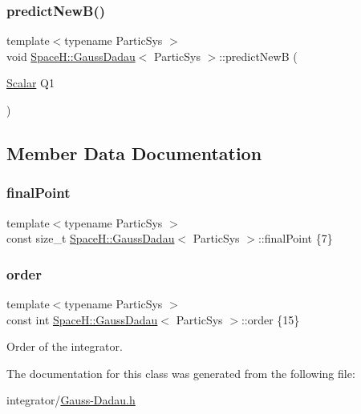 \subsubsection{\texorpdfstring{predict\+New\+B()}{predictNewB()}}
{\footnotesize\ttfamily template$<$typename Partic\+Sys $>$ \\
void \mbox{\hyperlink{class_space_h_1_1_gauss_dadau}{Space\+H\+::\+Gauss\+Dadau}}$<$ Partic\+Sys $>$\+::predict\+NewB (\begin{DoxyParamCaption}\item[{\mbox{\hyperlink{class_space_h_1_1_gauss_dadau_ace42540e9fb47d7f1d1f00622bbd1ccb}{Scalar}}}]{Q1 }\end{DoxyParamCaption})\hspace{0.3cm}{\ttfamily [inline]}}



\subsection{Member Data Documentation}
\mbox{\label{class_space_h_1_1_gauss_dadau_ac671afa9ebffbf85891ba283076d04f1}} 
\subsubsection{\texorpdfstring{final\+Point}{finalPoint}}
{\footnotesize\ttfamily template$<$typename Partic\+Sys $>$ \\
const size\+\_\+t \mbox{\hyperlink{class_space_h_1_1_gauss_dadau}{Space\+H\+::\+Gauss\+Dadau}}$<$ Partic\+Sys $>$\+::final\+Point \{7\}\hspace{0.3cm}{\ttfamily [static]}}

\mbox{\label{class_space_h_1_1_gauss_dadau_aa306d2c64787f9a38901bdddc791c938}} 
\subsubsection{\texorpdfstring{order}{order}}
{\footnotesize\ttfamily template$<$typename Partic\+Sys $>$ \\
const int \mbox{\hyperlink{class_space_h_1_1_gauss_dadau}{Space\+H\+::\+Gauss\+Dadau}}$<$ Partic\+Sys $>$\+::order \{15\}\hspace{0.3cm}{\ttfamily [static]}}



Order of the integrator. 



The documentation for this class was generated from the following file\+:\begin{DoxyCompactItemize}
\item 
integrator/\mbox{\hyperlink{_gauss-_dadau_8h}{Gauss-\/\+Dadau.\+h}}\end{DoxyCompactItemize}
